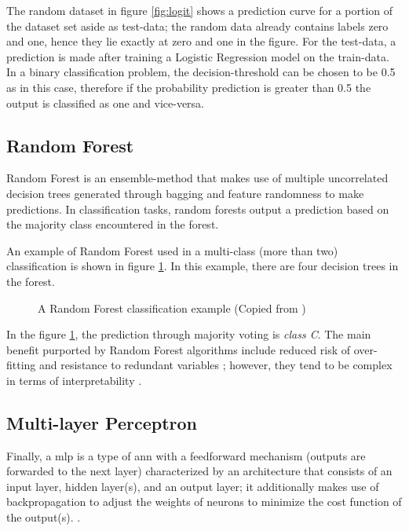 The random dataset in figure \ref{fig:logit} shows a prediction curve for a portion of the dataset set aside as \gls{test-data};
the random data already contains labels zero and one, hence they lie exactly at zero and one in the figure.
For the \gls{test-data}, a prediction is made after training a Logistic Regression model on the \gls{train-data}.
In a binary classification problem, the \gls{decision-threshold} can be chosen to be 0.5 as in this case,
therefore if the probability prediction is greater than 0.5 the output is classified as one and vice-versa.


\subsection{Random Forest}

Random Forest is an \gls{ensemble-method} that makes use of multiple uncorrelated decision trees generated through bagging and feature randomness to make predictions.
In classification tasks, random forests output a prediction based on the majority class encountered in the forest. \cite{ibm:rf}

An example of Random Forest used in a multi-class (more than two) classification is shown in figure \ref{fig:rf}.
In this example, there are four decision trees in the forest.

\begin{figure}[h]
\centering
    \caption{A Random Forest classification example (Copied from \cite{kirasich2018random})}
    \label{fig:rf}
\end{figure}

In the figure \ref{fig:rf}, the prediction through majority voting is \emph{class C}.
The main benefit purported by Random Forest algorithms include reduced risk of \gls{over-fitting} \cite{ibm:rf} and
resistance to redundant variables \cite{kirasich2018random};
however, they tend to be complex in terms of interpretability \cite{ibm:rf}.

\subsection{Multi-layer Perceptron}

Finally, a \gls{mlp} is a type of \gls{ann} with a feedforward mechanism (outputs are forwarded to the next layer) characterized by
an architecture that consists of an input layer, hidden layer(s), and an output layer;
it additionally makes use of backpropagation to adjust the weights of neurons to minimize the cost function of the output(s). \cite{taud2018multilayer}.



